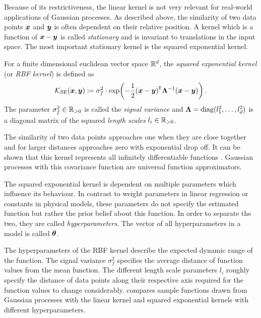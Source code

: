 Because of its restrictiveness, the linear kernel is not very relevant for real-world applications of Gaussian processes.
As described above, the similarity of two data points $\bm{x}$ and $\bm{y}$ is often dependent on their relative position.
A kernel which is a function of $\bm{x} - \bm{y}$ is called \emph{stationary} and is invariant to translations in the input space.
The most important stationary kernel is the squared exponential kernel.
\begin{definition}
    \label{def:rbf_kernel}
    For a finite dimensional euclidean vector space $\mathbb{R}^d$, the \emph{squared exponential kernel} (or \emph{RBF kernel}) is defined as
    \begin{align}
        \operatorname{\mathcal{K}}_{\text{SE}}(\bm{x}, \bm{y}) \coloneqq \sigma_f^2 \cdot \exp\!\left( -\frac{1}{2} (\bm{x} - \bm{y})^{\mkern-1.5mu\mathsf{T}} \bm{\Lambda}^{-1} (\bm{x} - \bm{y}) \right).
    \end{align}
    The parameter $\sigma_f^2 \in \mathbb{R}_{>0}$ is called the \emph{signal variance} and $\bm{\Lambda} = \operatorname{diag}(l_1^2, \dots, l_d^2)$ is a diagonal matrix of the squared \emph{length scales} $l_i \in \mathbb{R}_{>0}$.
\end{definition}
The similarity of two data points approaches one when they are close together and for larger distances approaches zero with exponential drop off.
It can be shown that this kernel represents all infinitely differentiable functions \cite{rasmussen_gaussian_2006}.
Gaussian processes with this covariance function are universal function approximators.

The squared exponential kernel is dependent on multiple parameters which influence its behaviour.
In contrast to weight parameters in linear regression or constants in physical models, these parameters do not specify the estimated function but rather the prior belief about this function.
In order to separate the two, they are called \emph{hyperparameters}.
The vector of all hyperparameters in a model is called $\bm{\theta}$.

The hyperparameters of the RBF kernel describe the expected dynamic range of the function.
The signal variance $\sigma_f^2$ specifies the average distance of function values from the mean function.
The different length scale parameters $l_i$ roughly specify the distance of data points along their respective axis required for the function values to change considerably.
 compares sample functions drawn from Gaussian processes with the linear kernel and squared exponential kernels with different hyperparameters.

